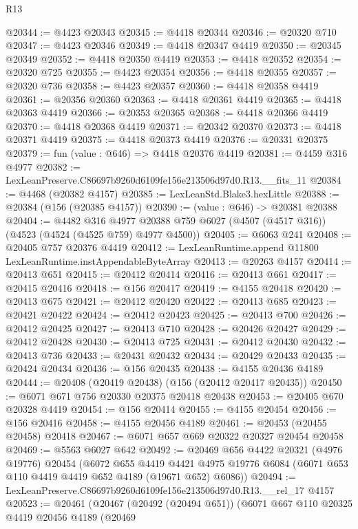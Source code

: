 \begin{lexlean}{R13}
\begin{coremodule}
@20344 := @4423 @20343
@20345 := @4418 @20344
@20346 := @20320 @710
@20347 := @4423 @20346
@20349 := @4418 @20347 @4419
@20350 := @20345 @20349
@20352 := @4418 @20350 @4419
@20353 := @4418 @20352
@20354 := @20320 @725
@20355 := @4423 @20354
@20356 := @4418 @20355
@20357 := @20320 @736
@20358 := @4423 @20357
@20360 := @4418 @20358 @4419
@20361 := @20356 @20360
@20363 := @4418 @20361 @4419
@20365 := @4418 @20363 @4419
@20366 := @20353 @20365
@20368 := @4418 @20366 @4419
@20370 := @4418 @20368 @4419
@20371 := @20342 @20370
@20373 := @4418 @20371 @4419
@20375 := @4418 @20373 @4419
@20376 := @20331 @20375
@20379 := fun (value : @646) => @4418 @20376 @4419
@20381 := @4459 @316 @4977
@20382 := LexLeanPreserve.C86697b9260d6109fe156e213506d97d0.R13.__fits_11
@20384 := @4468 (@20382 @4157)
@20385 := LexLeanStd.Blake3.hexLittle
@20388 := @20384 (@156 (@20385 @4157))
@20390 := (value : @646) -> @20381 @20388
@20404 := @4482
    @316
    @4977
    @20388
    @759
    @6027
    (@4507 (@4517 @316))
    (@4523 (@4524 (@4525 @759) @4977 @4500))
@20405 := @6063 @241
@20408 := @20405 @757 @20376 @4419
@20412 := LexLeanRuntime.append @11800 LexLeanRuntime.instAppendableByteArray
@20413 := @20263 @4157
@20414 := @20413 @651
@20415 := @20412 @20414
@20416 := @20413 @661
@20417 := @20415 @20416
@20418 := @156 @20417
@20419 := @4155 @20418
@20420 := @20413 @675
@20421 := @20412 @20420
@20422 := @20413 @685
@20423 := @20421 @20422
@20424 := @20412 @20423
@20425 := @20413 @700
@20426 := @20412 @20425
@20427 := @20413 @710
@20428 := @20426 @20427
@20429 := @20412 @20428
@20430 := @20413 @725
@20431 := @20412 @20430
@20432 := @20413 @736
@20433 := @20431 @20432
@20434 := @20429 @20433
@20435 := @20424 @20434
@20436 := @156 @20435
@20438 := @4155 @20436 @4189
@20444 := @20408 (@20419 @20438) (@156 (@20412 @20417 @20435))
@20450 := @6071 @671 @756 @20330 @20375 @20418 @20438
@20453 := @20405 @670 @20328 @4419
@20454 := @156 @20414
@20455 := @4155 @20454
@20456 := @156 @20416
@20458 := @4155 @20456 @4189
@20461 := @20453 (@20455 @20458) @20418
@20467 := @6071 @657 @669 @20322 @20327 @20454 @20458
@20469 := @5563 @6027 @642
@20492 := @20469
    @656
    @4422
    @20321
    (@4976 @19776)
    @20454
    (@6072
      @655
      @4419
      @4421
      @4975
      @19776
      @6084
      (@6071 @653 @110 @4419 @4419 @652 @4189 (@19671 @652) @6086))
@20494 := LexLeanPreserve.C86697b9260d6109fe156e213506d97d0.R13.__rel_17 @4157
@20523 := @20461
    (@20467
      (@20492 (@20494 @651))
      (@6071
        @667
        @110
        @20325
        @4419
        @20456
        @4189
        (@20469

\end{coremodule}
\end{lexlean}
